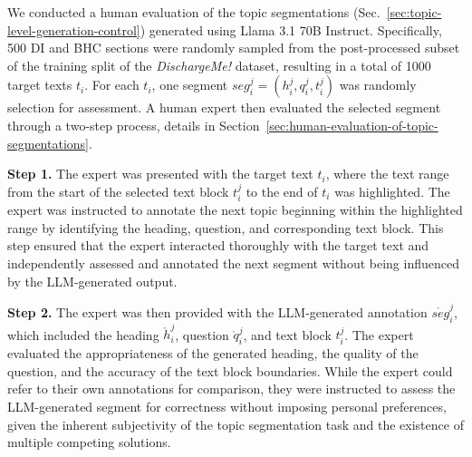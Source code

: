 \begin{table}[ht]
\centering
{}
\caption{Averages (and standard deviations) of various quantities of topic segmentations for DI and BHC sections of the DischargeMe! training split. The statistics for the number of segments \texttt{\#segments} and the token counts \texttt{\#tokens($\cdot$)} of headings $\mathring{h}_i^k$, questions $\mathring{q}_i^k$ and text blocks $t_i^k$ are consistently larger for BHC sections.}
\label{table:topic_segmentations_statistics}
\end{table}

We conducted a human evaluation of the topic segmentations (Sec.~\ref{sec:topic-level-generation-control}) generated using Llama 3.1 70B Instruct. Specifically, 500 DI and BHC sections were randomly sampled from the post-processed subset of the training split of the \textit{DischargeMe!} dataset, resulting in a total of 1000 target texts $t_i$. For each $t_i$, one segment $seg_i^j = (h_i^j, q_i^j, t_i^j)$ was randomly selection for assessment. A human expert then evaluated the selected segment through a two-step process, details in Section~\ref{sec:human-evaluation-of-topic-segmentations}.

\textbf{Step 1.} The expert was presented with the target text $t_i$, where the text range from the start of the selected text block $t_i^j$ to the end of $t_i$ was highlighted. The expert was instructed to annotate the next topic beginning within the highlighted range by identifying the heading, question, and corresponding text block. This step ensured that the expert interacted thoroughly with the target text and independently assessed and annotated the next segment without being influenced by the LLM-generated output.

\textbf{Step 2.} The expert was then provided with the LLM-generated annotation $\mathring{seg}_i^j$, which included the heading $\mathring{h}_i^j$, question $\mathring{q}_i^j$, and text block $t_i^j$. The expert evaluated the appropriateness of the generated heading, the quality of the question, and the accuracy of the text block boundaries.  While the expert could refer to their own annotations for comparison, they were instructed to assess the LLM-generated segment for correctness without imposing personal preferences, given the inherent subjectivity of the topic segmentation task and the existence of multiple competing solutions. 

